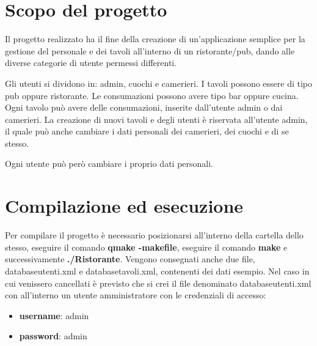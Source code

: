 \section{Scopo del progetto}
Il progetto realizzato ha il fine della creazione di un'applicazione semplice per la gestione del personale e dei tavoli all'interno di un ristorante/pub, dando alle diverse categorie di utente permessi differenti.

Gli utenti si dividono in: admin, cuochi e camerieri.
I tavoli possono essere di tipo pub oppure ristorante.
Le consumazioni possono avere tipo bar oppure cucina.
Ogni tavolo può avere delle consumazioni, inserite dall'utente admin o dai camerieri.
La creazione di nuovi tavoli e degli utenti è riservata all'utente admin, il quale può anche cambiare i dati personali dei camerieri, dei cuochi e di se stesso.

Ogni utente può però cambiare i proprio dati personali.

\section{Compilazione ed esecuzione}
Per compilare il progetto è necessario posizionarsi all'interno della cartella dello stesso, eseguire il comando \textbf{qmake -makefile}, eseguire il comando \textbf{make} e successivamente \textbf{./Ristorante}.
Vengono consegnati anche due file, databaseutenti.xml e databasetavoli.xml, contenenti dei dati esempio.
Nel caso in cui venissero cancellati è previsto che si crei il file denominato databaseutenti.xml con all'interno un utente amministratore con le credenziali di accesso:
\begin{itemize}
\item \textbf{username}: admin
\item \textbf{password}: admin
\end{itemize}	
